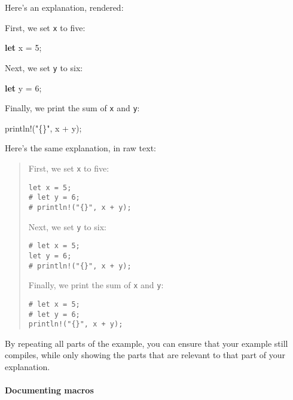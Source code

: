 \documentclass[a4paper,]{book}
\newenvironment{Shaded}{\begin{snugshade}}{\end{snugshade}}
\newcommand{\KeywordTok}[1]{\textcolor[rgb]{0.13,0.29,0.53}{\textbf{{#1}}}}
\newcommand{\DecValTok}[1]{\textcolor[rgb]{0.00,0.00,0.81}{{#1}}}
\newcommand{\StringTok}[1]{\textcolor[rgb]{0.31,0.60,0.02}{{#1}}}
\newcommand{\OtherTok}[1]{\textcolor[rgb]{0.56,0.35,0.01}{{#1}}}
\newcommand{\NormalTok}[1]{{#1}}
\begin{document}
Here's an explanation, rendered:

First, we set \texttt{x} to five:

\begin{Shaded}
\begin{Highlighting}[]
\KeywordTok{let} \NormalTok{x = }\DecValTok{5}\NormalTok{;}
\end{Highlighting}
\end{Shaded}

Next, we set \texttt{y} to six:

\begin{Shaded}
\begin{Highlighting}[]
\KeywordTok{let} \NormalTok{y = }\DecValTok{6}\NormalTok{;}
\end{Highlighting}
\end{Shaded}

Finally, we print the sum of \texttt{x} and \texttt{y}:

\begin{Shaded}
\begin{Highlighting}[]
\OtherTok{println!}\NormalTok{(}\StringTok{"\{\}"}\NormalTok{, x + y);}
\end{Highlighting}
\end{Shaded}

Here's the same explanation, in raw text:

\begin{quote}
First, we set \texttt{x} to five:

\begin{verbatim}
let x = 5;
# let y = 6;
# println!("{}", x + y);
\end{verbatim}

Next, we set \texttt{y} to six:

\begin{verbatim}
# let x = 5;
let y = 6;
# println!("{}", x + y);
\end{verbatim}

Finally, we print the sum of \texttt{x} and \texttt{y}:

\begin{verbatim}
# let x = 5;
# let y = 6;
println!("{}", x + y);
\end{verbatim}
\end{quote}

By repeating all parts of the example, you can ensure that your example
still compiles, while only showing the parts that are relevant to that
part of your explanation.

\paragraph{Documenting macros}\label{documenting-macros}
\end{document}
